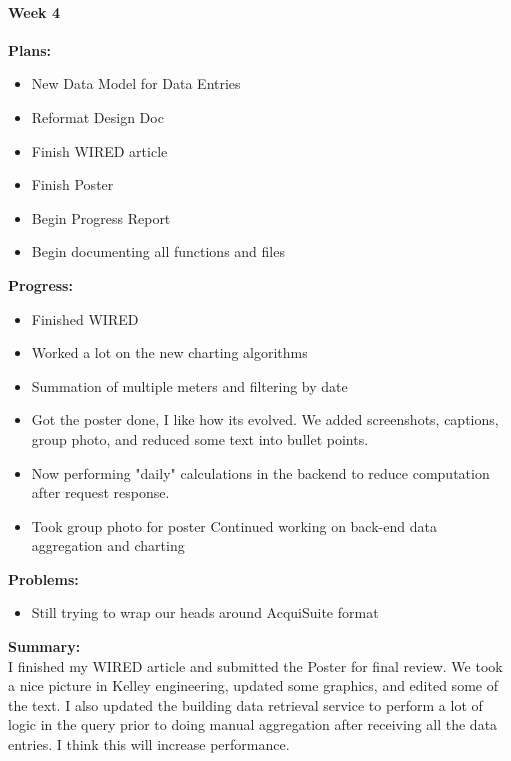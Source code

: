 \paragraph{Week 4}
\begin{adjustwidth}{2.5em}{0pt}
    \vspace{-0.5cm}\textbf{Plans:}
    \vspace{-0.5cm}
    \begin{itemize}
        \item New Data Model for Data Entries
        \item Reformat Design Doc
        \item Finish WIRED article
        \item Finish Poster
        \item Begin Progress Report
        \item Begin documenting all functions and files
    \end{itemize} 
    \vspace{-0.3cm}\textbf{Progress:}
    \vspace{-0.5cm}
    \begin{itemize}
        \item Finished WIRED
        \item Worked a lot on the new charting algorithms
        \item Summation of multiple meters and filtering by date 
        \item Got the poster done, I like how its evolved.
        \subitem We added screenshots, captions, group photo, and reduced some text into bullet points. 
        \item Now performing "daily" calculations in the backend to reduce computation after request response. 
        \item Took group photo for poster
    Continued working on back-end data aggregation and charting
    \end{itemize} 
    \vspace{-0.3cm}\textbf{Problems:}
    \vspace{-0.5cm}
    \begin{itemize}
        \item Still trying to wrap our heads around AcquiSuite format
    \end{itemize}  
    \vspace{-0.3cm}\noindent\textbf{Summary:}\\
    \noindent I finished my WIRED article and submitted the Poster for final review. We took a nice picture in Kelley engineering, updated some graphics, and edited some of the text. I also updated the building data retrieval service to perform a lot of logic in the query prior to doing manual aggregation after receiving all the data entries. I think this will increase performance.
\end{adjustwidth} 
